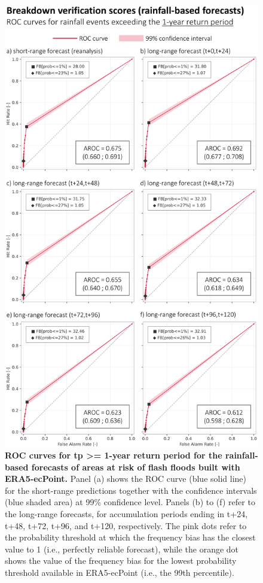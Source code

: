 \begin{figure}[htbp]
\centering
\includegraphics[width=\textwidth]{chapter_05/figures/rainfall_based_ff_verif_breakdown_scores_roc_1rp.png}
\caption{\textbf{ROC curves for tp >= 1-year return period for the rainfall-based forecasts of areas at risk of flash floods built with ERA5-ecPoint.} Panel (a) shows the ROC curve (blue solid line) for the short-range predictions together with the confidence intervals (blue shaded area) at 99\% confidence level. Panels (b) to (f) refer to the long-range forecasts, for accumulation periods ending in t+24, t+48, t+72, t+96, and t+120, respectively. The pink dots refer to the probability threshold at which the frequency bias has the closest value to 1 (i.e., perfectly reliable forecast), while the orange dot shows the value of the frequency bias for the lowest probability threshold available in ERA5-ecPoint (i.e., the 99th percentile).}
\label{fig:rainfall_based_ff_verif_breakdown_scores_roc_1rp}
\end{figure}

